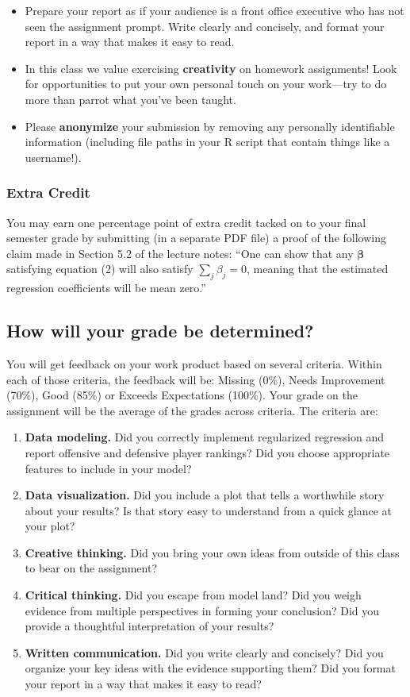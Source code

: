 \documentclass{article}
\begin{document}
        \begin{itemize}
          \item Prepare your report as if your audience is a front office executive who has not seen the assignment prompt. Write clearly and concisely, and format your report in a way that makes it easy to read.
          \item In this class we value exercising {\bf creativity} on homework assignments! Look for opportunities to put your own personal touch on your work---try to do more than parrot what you've been taught.
          \item Please {\bf anonymize} your submission by removing any personally identifiable information (including file paths in your R script that contain things like a username!).
        \end{itemize}

      \subsubsection*{\sc Extra Credit}

        You may earn one percentage point of extra credit tacked on to your final semester grade by submitting (in a separate PDF file) a proof of the following claim made in Section 5.2 of the lecture notes: ``One can show that any $\boldsymbol{\beta}$ satisfying equation (2) will also satisfy $\sum_j \beta_j = 0$, meaning that the estimated regression coefficients will be mean zero.''

    \subsection*{\sc How will your grade be determined?}

      You will get feedback on your work product based on several criteria. Within each of those criteria, the feedback will be: Missing (0\%), Needs Improvement (70\%), Good (85\%) or Exceeds Expectations (100\%). Your grade on the assignment will be the average of the grades across criteria. The criteria are:
      \begin{enumerate}
        \item {\bf Data modeling.} Did you correctly implement regularized regression and report offensive and defensive player rankings? Did you choose appropriate features to include in your model?
        \item {\bf Data visualization.} Did you include a plot that tells a worthwhile story about your results? Is that story easy to understand from a quick glance at your plot?
        \item {\bf Creative thinking.} Did you bring your own ideas from outside of this class to bear on the assignment?
        \item {\bf Critical thinking.} Did you escape from model land? Did you weigh evidence from multiple perspectives in forming your conclusion? Did you provide a thoughtful interpretation of your results?
        \item {\bf Written communication.} Did you write clearly and concisely? Did you organize your key ideas with the evidence supporting them? Did you format your report in a way that makes it easy to read?
      \end{enumerate}
\end{document}
